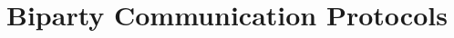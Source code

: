 \documentclass[a4paper,twoside]{article}
\newcommand{\TODO}[1]{\textcolor{YellowOrange}{(TODO: #1)}} %
\begin{document}
%
%
%
%
%
%
%
%

\clearpage
\section{Biparty Communication Protocols}
\label{biparty}
\end{document}
